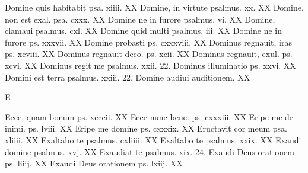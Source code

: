 \documentclass[a5paper,10pt]{book}
\begin{document}
\begin{multicols}{2}
\newline Domine quis habitabit psa. xiiii. \hfill XX
\newline Domine, in virtute psalmus. xx. \hfill XX
\newline Domine, non est exal. psa. cxxx. \hfill XX
\newline Domine ne in furore psalmus. vi. \hfill XX
\newline Domine, clamaui psalmus. cxl. \hfill XX
\newline Domine quid multi psalmus. iii. \hfill XX
\newline Domine ne in furore ps. xxxvii. \hfill XX
\newline Domine probasti ps. cxxxviii. \hfill XX
\newline Dominus regnauit, iras ps. xcviii. \hfill XX
\newline Dominus regnauit deco. ps. xcii. \hfill XX
\newline Dominus regnauit, exul. ps. xcvi. \hfill XX
\newline Dominus regit me psalmus. xxii. \hfill 22.
\newline Dominus illuminatio ps. xxvi. \hfill XX
\newline Domini est terra psalmus. xxiii. \hfill 22.
\newline Domine audiui auditionem. \hfill XX
\newline \vspace{-1.75em}
\begin{center}
\color{red} E
\end{center}
\vspace{-.75em}
\par \noindent Ecce, quam bonum ps. xcccii. \hfill XX
\newline Ecce nunc bene. ps. cxxxiii. \hfill XX
\newline Eripe me de inimi. ps. lviii. \hfill XX
\newline Eripe me domine ps. cxxxix. \hfill XX
\newline Eructavit cor meum psa. xliiii. \hfill XX
\newline Exaltabo te psalmus. cxliiii. \hfill XX
\newline Exaltabo te psalmus. xxix. \hfill XX
\newline Exaudi domine psalmus. xvj. \hfill XX
\newline Exaudiat te psalmus. xix. \hfill \hyperlink{ps19}{24.}
\newline Exaudi Deus orationem ps. liiij. \hfill XX
\newline Exaudi Deus orationem ps. lxiij. \hfill XX

\end{multicols}
\end{document}
